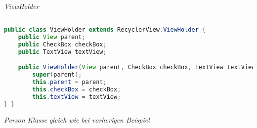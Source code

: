 \textit{ViewHolder}
\begin{lstlisting}[language=java]

public class ViewHolder extends RecyclerView.ViewHolder {
    public View parent;
    public CheckBox checkBox;
    public TextView textView;

    public ViewHolder(View parent, CheckBox checkBox, TextView textView) {
        super(parent);
        this.parent = parent;
        this.checkBox = checkBox;
        this.textView = textView;
} }
\end{lstlisting}

\textit{Person Klasse gleich wie bei vorherigen Beispiel}





